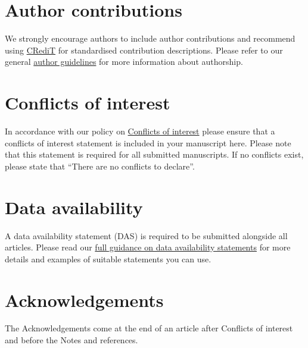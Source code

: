 \documentclass[twoside,twocolumn,9pt]{article}
\renewcommand{\refname}{Notes and references}
\begin{document}
\section*{Author contributions}
We strongly encourage authors to include author contributions and recommend using \href{https://casrai.org/credit/}{CRediT} for standardised contribution descriptions. Please refer to our general \href{https://www.rsc.org/journals-books-databases/journal-authors-reviewers/author-responsibilities/}{author guidelines} for more information about authorship.

\section*{Conflicts of interest}
In accordance with our policy on \href{https://www.rsc.org/journals-books-databases/journal-authors-reviewers/author-responsibilities/#code-of-conduct}{Conflicts of interest} please ensure that a conflicts of interest statement is included in your manuscript here.  Please note that this statement is required for all submitted manuscripts.  If no conflicts exist, please state that ``There are no conflicts to declare''.

\section*{Data availability}


A data availability statement (DAS) is required to be submitted alongside all articles. Please read our \href{https://www.rsc.org/journals-books-databases/author-and-reviewer-hub/authors-information/prepare-and-format/data-sharing/#dataavailabilitystatements}{full guidance on data availability statements} for more details and examples of suitable statements you can use.

\section*{Acknowledgements}
The Acknowledgements come at the end of an article after Conflicts of interest and before the Notes and references.



\balance


\end{document}
